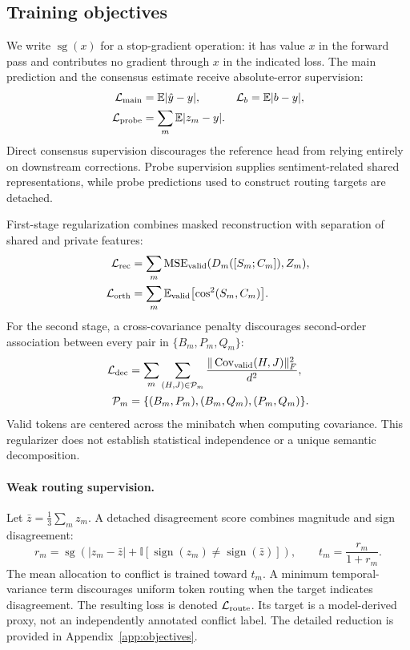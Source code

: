 \documentclass[review,12pt]{elsarticle}
\newcommand{\sg}{\operatorname{sg}}
\newcommand{\E}{\mathbb{E}}
\begin{document}
\subsection{Training objectives}
We write $\sg(x)$ for a stop-gradient operation: it has value $x$ in the forward pass and contributes no gradient through $x$ in the indicated loss.
The main prediction and the consensus estimate receive absolute-error supervision:
\begin{align}
\mathcal L_{\rm main}&=\E|\hat y-y|,&
\mathcal L_b&=\E|b-y|,\nonumber\\
\mathcal L_{\rm probe}&=\sum_m\E|z_m-y|.
\end{align}
Direct consensus supervision discourages the reference head from relying entirely on downstream corrections. Probe supervision supplies sentiment-related shared representations, while probe predictions used to construct routing targets are detached.

First-stage regularization combines masked reconstruction with separation of shared and private features:
\begin{align}
\mathcal L_{\rm rec}&=\sum_m\operatorname{MSE}_{\rm valid}(D_m([S_m;C_m]),Z_m),\\
\mathcal L_{\rm orth}&=\sum_m\E_{\rm valid}\bigl[\cos^2(S_m,C_m)\bigr].
\end{align}
For the second stage, a cross-covariance penalty discourages second-order association between every pair in $\{B_m,P_m,Q_m\}$:
\begin{align}
\mathcal L_{\rm dec}&=\sum_m\sum_{(H,J)\in\mathcal P_m}
\frac{\|\operatorname{Cov}_{\rm valid}(H,J)\|_F^2}{d^2},\\
\mathcal P_m&=\{(B_m,P_m),(B_m,Q_m),(P_m,Q_m)\}.
\end{align}
Valid tokens are centered across the minibatch when computing covariance. This regularizer does not establish statistical independence or a unique semantic decomposition.

\paragraph{Weak routing supervision.}
Let $\bar z=\frac13\sum_m z_m$. A detached disagreement score combines magnitude and sign disagreement:
\begin{equation}
r_m=\sg\left(|z_m-\bar z|+\mathbb I[\operatorname{sign}(z_m)\ne\operatorname{sign}(\bar z)]\right),\qquad
t_m=\frac{r_m}{1+r_m}.
\label{eq:weak_target}
\end{equation}
The mean allocation to conflict is trained toward $t_m$. A minimum temporal-variance term discourages uniform token routing when the target indicates disagreement. The resulting loss is denoted $\mathcal L_{\rm route}$. Its target is a model-derived proxy, not an independently annotated conflict label. The detailed reduction is provided in Appendix~\ref{app:objectives}.
\end{document}
